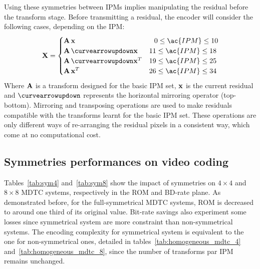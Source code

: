 \documentclass[11pt,a4paper,openright,twoside]{book}
\numberwithin{equation}{section} %
\numberwithin{figure}{section} %
\numberwithin{table}{section} %
\begin{document}
Using these symmetries between \acp{IPM} implies manipulating the residual
before the transform stage.
Before transmitting a residual, the encoder will consider the following cases,
depending on the \ac{IPM}:
\begin{equation}
	\X =
	\begin{cases}
		\A \, \x & \;\;\, 0 \le \ac{IPM} \le 10 \\
		\A \, \curvearrowupdown\x & 11 \le \ac{IPM} \le 18 \\
		\A \, \curvearrowupdown\x^T & 19 \le \ac{IPM} \le 25 \\
		\A \, \x^T & 26 \le \ac{IPM} \le 34 \\
	\end{cases}
\end{equation}
Where $\mathbf{A}$ is a transform designed for the basic IPM set, $\mathbf{x}$ is the current
residual and $\curvearrowupdown$ represents the horizontal mirroring operator
(top-bottom).
Mirroring and transposing operations are used to make residuals compatible
with the transforms learnt for the basic IPM set.
These operations are only different ways of re-arranging the residual pixels
in a consistent way, which come at no computational cost.

\subsection{Symmetries performances on video coding}
\label{sub:symmetries_performances_on_video_coding}

Tables~\ref{tab:sym4} and~\ref{tab:sym8} show the impact of symmetries on
$4\times4$ and $8\times8$ \ac{MDTC} systems, respectively in the \acs{ROM} and
\ac{BD}-rate plane.
As demonstrated before, for the full-symmetrical \ac{MDTC} systems, \acs{ROM}
is decreased to around one third of its original value.
Bit-rate savings also experiment some losses since symmetrical system are more
constraint than non-symmetrical systems.
The encoding complexity for symmetrical system is equivalent to the one for
non-symmetrical ones, detailed in tables~\ref{tab:homogeneous_mdtc_4}
and~\ref{tab:homogeneous_mdtc_8}, since the number of transforms par \ac{IPM}
remains unchanged.
\end{document}
